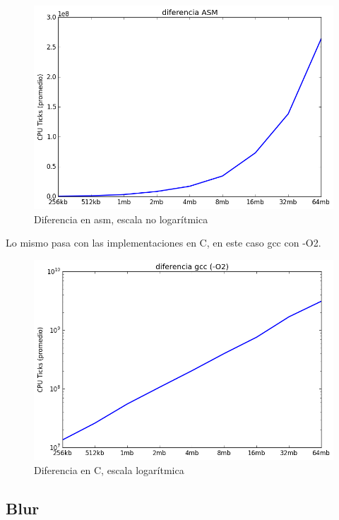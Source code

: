 \documentclass[a4paper]{article}
\begin{document}
\begin{figure}[h]
	\includegraphics[scale=0.60]{imagenes/test_performance_size_ASM_not_log.png}
	\caption{Diferencia en asm, escala no logarítmica}
\end{figure}

\newpage 

Lo mismo pasa con las implementaciones en C, en este caso gcc con -O2.

\begin{figure}[h]
	\includegraphics[scale=0.60]{imagenes/test_performance_size_C.png}
	\caption{Diferencia en C, escala logarítmica}
\end{figure}


\subsection{Blur}
\end{document}

